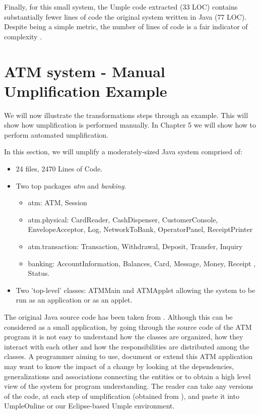 Finally, for this small system, the Umple code extracted (33 LOC) contains substantially fewer lines of code the original system written in Java (77 LOC). Despite being a simple metric, the number of lines of code is a fair indicator of complexity \cite{LOCMetric}. 

\section{ATM system - Manual Umplification Example}

We will now illustrate the transformations steps through an example. This will show how umplification is performed manually. In Chapter 5 we will show how to perform automated umplification.

In this section, we will umplify a moderately-sized Java system  comprised of:

\begin{itemize}
 \item 24 files, 2470 Lines of Code.
 \item Two top packages \textit{atm} and \textit{banking}.
	\begin{itemize}
	 \item atm: ATM, Session
	 \item atm.physical: CardReader, CashDispenser, CustomerConsole, EnvelopeAcceptor, Log, NetworkToBank, OperatorPanel, ReceiptPrinter
	 \item atm.transaction: Transaction, Withdrawal, Deposit, Transfer, Inquiry
	 \item banking: AccountInformation, Balances, Card, Message, Money, Receipt , Status.
	\end{itemize}
 \item Two 'top-level' classes: ATMMain and ATMApplet allowing the system to be run as an application or as an applet.
\end{itemize}

The original Java source code has been taken from \cite{atmsystem}. Although this can be considered as a small application, by going through the source code of the ATM program it is not easy to understand how the classes are organized, how they interact with each other and how the responsibilities are distributed among the classes. A programmer aiming to use, document or extend this ATM application may want to know the impact of a change by looking at the dependencies, generalizations and associations connecting the entities or to obtain a high level view of the system for program understanding. The reader can take any versions of the code, at each step of umplification (obtained from \cite{UmplificationBasicExampleURL}), and paste it into UmpleOnline \cite{UmpleOnline} or our Eclipse-based Umple environment. 

